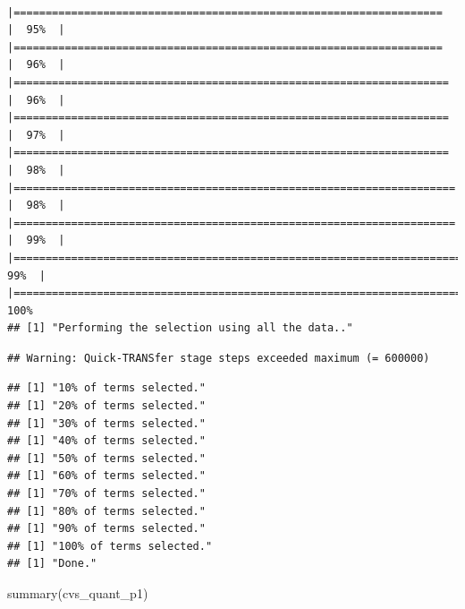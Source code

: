 \documentclass[
]{article}
\newenvironment{Shaded}{\begin{snugshade}}{\end{snugshade}}
\newcommand{\FunctionTok}[1]{\textcolor[rgb]{0.00,0.00,0.00}{#1}}
\newcommand{\NormalTok}[1]{#1}
\begin{document}
\begin{verbatim}
          |===================================================================   |  95%  |                                                                              |===================================================================   |  96%  |                                                                              |====================================================================  |  96%  |                                                                              |====================================================================  |  97%  |                                                                              |====================================================================  |  98%  |                                                                              |===================================================================== |  98%  |                                                                              |===================================================================== |  99%  |                                                                              |======================================================================|  99%  |                                                                              |======================================================================| 100%
## [1] "Performing the selection using all the data.."
\end{verbatim}

\begin{verbatim}
## Warning: Quick-TRANSfer stage steps exceeded maximum (= 600000)
\end{verbatim}

\begin{verbatim}
## [1] "10% of terms selected."
## [1] "20% of terms selected."
## [1] "30% of terms selected."
## [1] "40% of terms selected."
## [1] "50% of terms selected."
## [1] "60% of terms selected."
## [1] "70% of terms selected."
## [1] "80% of terms selected."
## [1] "90% of terms selected."
## [1] "100% of terms selected."
## [1] "Done."
\end{verbatim}

\begin{Shaded}
\begin{Highlighting}[]
\FunctionTok{summary}\NormalTok{(cvs\_quant\_p1)}
\end{Highlighting}
\end{Shaded}
\end{document}
